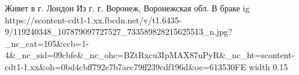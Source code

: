 
 
 
 
 

\par
Живет в г. Лондон
Из г. г. Воронеж, Воронежская обл.
В браке
\ifcmt
  ig https://scontent-cdt1-1.xx.fbcdn.net/v/t1.6435-9/119240348_107879097727527_733589828215625513_n.jpg?_nc_cat=105&ccb=1-4&_nc_sid=09cbfe&_nc_ohc=BZtRxcu3IpMAX87uPyR&_nc_ht=scontent-cdt1-1.xx&oh=0bd4cbff792e7b7aec79ff239cdf196d&oe=613530FE
  width 0.15
\fi

